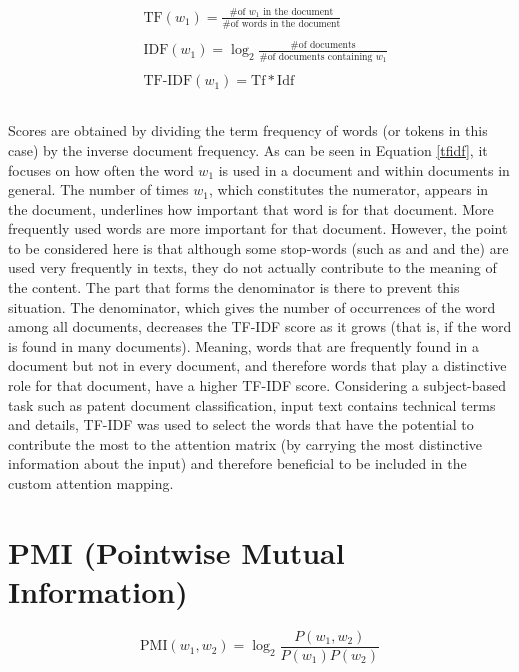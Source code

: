 \documentclass{iyte}
\begin{document}
\begin{align} 
\label{tfidf}
	\begin{split}
		&\textrm{TF}(w_1) = \frac{\textrm{\# of $w_1$ in the document}}{\textrm{\# of words in the document}}\\ \\
		&\textrm{IDF}(w_1) = \log_2 \frac{\textrm{\# of documents}}{\textrm{\# of documents containing $w_1$}}\\ \\
        &\textrm{TF-IDF}(w_1) = \textrm{Tf} * \textrm{Idf}\\ \\
	\end{split}					
\end{align}

Scores are obtained by dividing the term frequency of words (or tokens in this case) by the inverse document frequency. As can be seen in Equation \ref{tfidf}, it focuses on how often the word \(w_1\) is used in a document and within documents in general. The number of times \(w_1\), which constitutes the numerator, appears in the document, underlines how important that word is for that document. More frequently used words are more important for that document. However, the point to be considered here is that although some stop-words (such as and and the) are used very frequently in texts, they do not actually contribute to the meaning of the content. The part that forms the denominator is there to prevent this situation. The denominator, which gives the number of occurrences of the word among all documents, decreases the TF-IDF score as it grows (that is, if the word is found in many documents). Meaning, words that are frequently found in a document but not in every document, and therefore words that play a distinctive role for that document, have a higher TF-IDF score. Considering a subject-based task such as patent document classification, input text contains technical terms and details, TF-IDF was used to select the words that have the potential to contribute the most to the attention matrix (by carrying the most distinctive information about the input) and therefore beneficial to be included in the custom attention mapping.

\section{PMI (Pointwise Mutual Information)}

\begin{equation}
\label{PMI}
\textrm{PMI}(w_1, w_2) = \log_2 \frac{P(w_1,w_2)}{P(w_1)P(w_2)}
\end{equation}
\end{document}
